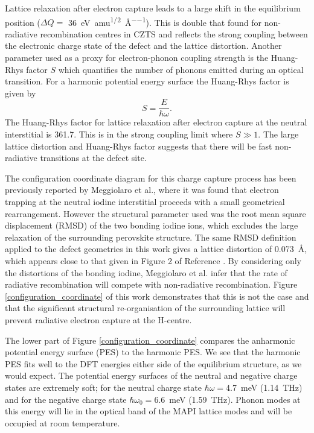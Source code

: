 Lattice relaxation after electron capture leads to a large shift in the equilibrium position ($\Delta Q=$ \SI{36}{\electronvolt\per amu\tothe{1/2}\per\angstrom}).
This is double that found for non-radiative recombination centres in CZTS\autocite{Kim2018} and reflects the strong coupling between the electronic charge state of the defect and the lattice distortion. 
Another parameter used as a proxy for electron-phonon coupling strength is the Huang-Rhys factor $S$ which quantifies the number of phonons emitted during an optical transition. For a harmonic potential energy surface the Huang-Rhys factor is given by 
\begin{equation}
S = \frac{E}{\hbar\omega}.
\end{equation}
The Huang-Rhys factor for lattice relaxation after electron capture at the neutral interstitial is 361.7. This is in the strong coupling limit where $S\gg1$. The large lattice distortion and Huang-Rhys factor suggests that there will be fast non-radiative transitions at the defect site.\autocite{Hayes1985,Hughes1967}

The configuration coordinate diagram for this charge capture process has been previously reported by Meggiolaro et al.,\autocite{Meggiolaro2018} where it was found that electron trapping at the neutral iodine interstitial proceeds with a small geometrical rearrangement. However the structural parameter used was the root mean square displacement (RMSD) of the two bonding iodine ions, which excludes the large relaxation of the surrounding perovskite structure. The same RMSD definition applied to the defect geometries in this work gives a lattice distortion of \SI{0.073}{\angstrom}, which appears close to that given in Figure 2 of Reference \cite{Meggiolaro2018}. By considering only the distortions of the bonding iodine, Meggiolaro et al. infer that the rate of radiative recombination will compete with non-radiative recombination. Figure \ref{configuration_coordinate} of this work demonstrates that this is not the case and that the significant structural re-organisation of the surrounding lattice will prevent radiative electron capture at the H-centre.

The lower part of Figure \ref{configuration_coordinate} compares the anharmonic potential energy surface (PES) to the harmonic PES. We see that the harmonic PES fits well to the DFT energies either side of the equilibrium structure, as we would expect. The potential energy surfaces of the neutral and negative charge states are extremely soft; for the neutral charge state $\hbar\omega=$\SI{4.7}{meV} (\SI{1.14}{\tera\hertz}) and for the negative charge state $\hbar\omega_0=$\SI{6.6}{meV} (\SI{1.59}{\tera\hertz}). Phonon modes at this energy will lie in the optical band of the MAPI lattice modes and will be occupied at room temperature.

